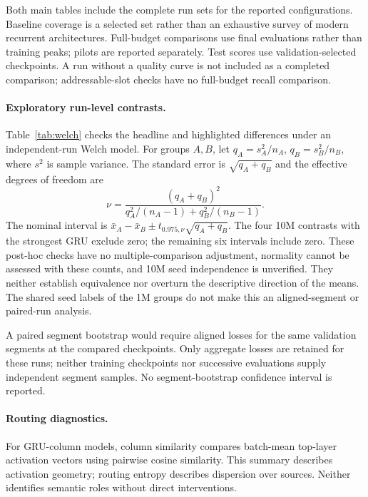 \documentclass[letterpaper,twoside]{article}
\begin{document}
Both main tables include the complete run sets for the reported configurations. Baseline coverage is a selected set rather than an exhaustive survey of modern recurrent architectures. Full-budget comparisons use final evaluations rather than training peaks; pilots are reported separately. Test scores use validation-selected checkpoints. A run without a quality curve is not included as a completed comparison; addressable-slot checks have no full-budget recall comparison.

\paragraph{Exploratory run-level contrasts.}
Table~\ref{tab:welch} checks the headline and highlighted differences under an independent-run Welch model. For groups $A,B$, let $q_A=s_A^2/n_A$, $q_B=s_B^2/n_B$, where $s^2$ is sample variance. The standard error is $\sqrt{q_A+q_B}$ and the effective degrees of freedom are
\begin{equation}
\nu=\frac{(q_A+q_B)^2}{q_A^2/(n_A-1)+q_B^2/(n_B-1)}.
\end{equation}
The nominal interval is $\bar x_A-\bar x_B\pm t_{0.975,\nu}\sqrt{q_A+q_B}$. The four 10M contrasts with the strongest GRU exclude zero; the remaining six intervals include zero. These post-hoc checks have no multiple-comparison adjustment, normality cannot be assessed with these counts, and 10M seed independence is unverified. They neither establish equivalence nor overturn the descriptive direction of the means. The shared seed labels of the 1M groups do not make this an aligned-segment or paired-run analysis.



A paired segment bootstrap would require aligned losses for the same validation segments at the compared checkpoints. Only aggregate losses are retained for these runs; neither training checkpoints nor successive evaluations supply independent segment samples. No segment-bootstrap confidence interval is reported.

\paragraph{Routing diagnostics.}
For GRU-column models, column similarity compares batch-mean top-layer activation vectors using pairwise cosine similarity. This summary describes activation geometry; routing entropy describes dispersion over sources. Neither identifies semantic roles without direct interventions.
\end{document}
